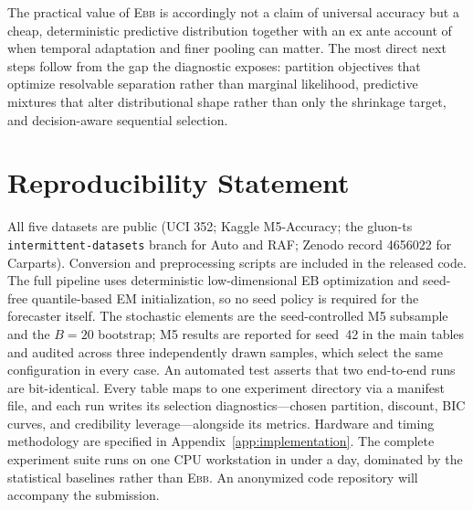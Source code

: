 \documentclass[twocolumn,10pt]{article}
\theoremstyle{definition}
\newcommand{\EBB}{\textsc{Ebb}}
\begin{document}
The practical value of \EBB{} is accordingly not a claim of universal
accuracy but a cheap, deterministic predictive distribution together with
an ex ante account of when temporal adaptation and finer pooling can
matter. The most direct next steps follow from the gap the diagnostic
exposes: partition objectives that optimize resolvable separation rather
than marginal likelihood, predictive mixtures that alter distributional
shape rather than only the shrinkage target, and decision-aware sequential
selection.

\section*{Reproducibility Statement}
All five datasets are public (UCI 352; Kaggle M5-Accuracy; the gluon-ts
\texttt{intermittent-datasets} branch for Auto and RAF; Zenodo record
4656022 for Carparts). Conversion and preprocessing scripts are included
in the released code. The full pipeline uses deterministic low-dimensional
EB optimization and seed-free quantile-based EM initialization, so no seed
policy is required for the forecaster itself. The stochastic elements are
the seed-controlled M5 subsample and the $B{=}20$ bootstrap; M5 results
are reported for seed~42 in the main tables and audited across three
independently drawn samples, which select the same configuration in every
case. An automated test asserts that two end-to-end runs are
bit-identical. Every table maps to one experiment directory via a manifest
file, and each run writes its selection diagnostics---chosen partition,
discount, BIC curves, and credibility leverage---alongside its metrics. Hardware and
timing methodology are specified in Appendix~\ref{app:implementation}.
The complete experiment suite runs on one CPU workstation in under a
day, dominated by the statistical baselines rather than \EBB{}. An
anonymized code repository will accompany the submission.
\end{document}
